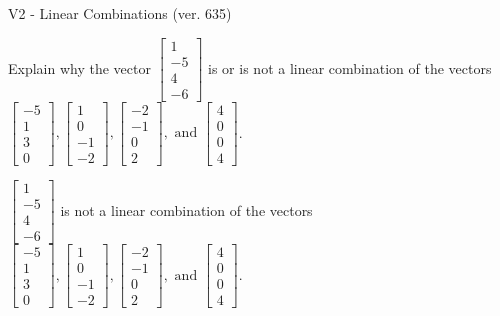 \begin{exercise}
  \begin{exerciseTitle}V2 - Linear Combinations (ver. 635)\end{exerciseTitle}
  \begin{exerciseStatement}
    Explain why the vector \(\left[\begin{array}{c}
1 \\
-5 \\
4 \\
-6
\end{array}\right]\)  is or is not a linear 
	combination of the vectors \(\left[\begin{array}{c}
-5 \\
1 \\
3 \\
0
\end{array}\right] , \left[\begin{array}{c}
1 \\
0 \\
-1 \\
-2
\end{array}\right] , \left[\begin{array}{c}
-2 \\
-1 \\
0 \\
2
\end{array}\right] , \text{ and } \left[\begin{array}{c}
4 \\
0 \\
0 \\
4
\end{array}\right]\).
	


  \end{exerciseStatement}
  \begin{exerciseAnswer}
   \(\left[\begin{array}{c}
1 \\
-5 \\
4 \\
-6
\end{array}\right]\) 
  	 is not  
	a linear combination of the vectors \(\left[\begin{array}{c}
-5 \\
1 \\
3 \\
0
\end{array}\right] , \left[\begin{array}{c}
1 \\
0 \\
-1 \\
-2
\end{array}\right] , \left[\begin{array}{c}
-2 \\
-1 \\
0 \\
2
\end{array}\right] , \text{ and } \left[\begin{array}{c}
4 \\
0 \\
0 \\
4
\end{array}\right]\).


\end{exerciseAnswer}
\end{exercise}

